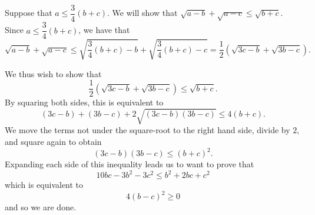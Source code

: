 \documentclass{article}
\begin{document}
\begin{enumerate}[1.]
Suppose that $a \leq \dfrac{3}{4} (b + c)$. We will show that $\sqrt{a-b} +\sqrt{a-c} \leq \sqrt{b+c}$. Since $a \leq \dfrac{3}{4} (b + c)$, we have that
\[
	\sqrt{a-b} +\sqrt{a-c} \leq \sqrt{\frac{3}{4}(b + c) - b} + \sqrt{\frac{3}{4}(b + c) - c} = \frac{1}{2} \left(\sqrt{3c - b} + \sqrt{3b - c}\right).
\]

We thus wish to show that
\[
	\dfrac{1}{2} \left(\sqrt{3c - b} + \sqrt{3b - c}\right)  \leq \sqrt{b + c}.
\]
By squaring both sides, this is equivalent to
\[
	(3c - b) + (3b - c) + 2\sqrt{(3c - b)(3b - c)}  \leq 4(b + c).
\]
We move the terms not under the square-root to the right hand side, divide by $2$, and square again to obtain
\[
	(3c - b)(3b - c) \leq (b + c)^2.
\]
Expanding each side of this inequality leads us to want to prove that
\[
	10bc - 3b^2 - 3c^2 \leq b^2 + 2bc + c^2
\]
which is equivalent to
\[
	4(b - c)^2 \geq 0
\]
and so we are done.


\end{enumerate}
\end{document}
